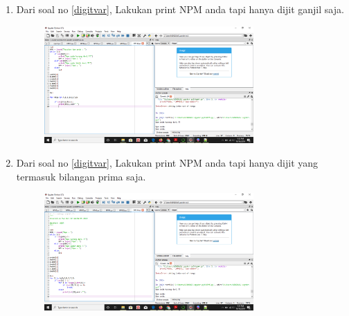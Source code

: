 \begin{enumerate}
\item
Dari soal no \ref{digitvar}, Lakukan print NPM anda tapi hanya dijit ganjil saja.
\begin{figure}[h]
\centerline{\includegraphics[width=8cm]{gambar/npm10.png}}
\end{figure}


\item 
Dari soal no \ref{digitvar}, Lakukan print NPM anda tapi hanya dijit yang termasuk bilangan prima saja.
\begin{figure}[h]
\centerline{\includegraphics[width=8cm]{gambar/npmsebelas.png}}
\end{figure}


\end{enumerate}


